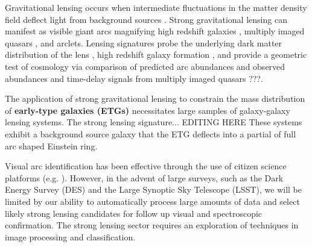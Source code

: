 \documentclass{emulateapj}
\newcommand{\todo}[1]{{\bf\color{blue} #1}}
\begin{document}
Gravitational lensing occurs when intermediate fluctuations in the
matter density field deflect light from background sources
\citep[see][for a review]{kneibandnatarajan_11}.  Strong gravitational
lensing can manifest as visible giant arcs magnifying high redshift
galaxies \citep{lyndsandpetrosian_86,gladders_etal03}, multiply imaged
quasars \citep{walsh_etal79}, and arclets.  Lensing signatures probe
the underlying dark matter distribution of the lens
\citep{warrenanddye_03}, high redshift galaxy formation
\citep{allam_etal07}, and provide a geometric test of cosmology via
comparison of predicted arc abundances and observed abundances
\citep{kochanek_96,chae_03,linder_04} and time-delay signals from
multiply imaged quasars ???\citep{}.

The application of strong gravitational lensing to constrain the mass
distribution of \todo{early-type galaxies (ETGs)} necessitates large
samples of galaxy-galaxy lensing systems.  The strong lensing
signature... EDITING HERE These systems exhibit a background source
galaxy that the ETG deflects into a partial of full arc shaped
Einstein ring.

Visual arc identification has been effective through the use of
citizen science platforms (e.g. \citet{marshall_etal16,more_etal16}).
However, in the advent of large surveys, such as the Dark Energy
Survey (DES) and the Large Synoptic Sky Telescope (LSST), we will be
limited by our ability to automatically process large amounts of data
and select likely strong lensing candidates for follow up visual and
spectroscopic confirmation.  The strong lensing sector requires an
exploration of techniques in image processing and classification.
\end{document}
